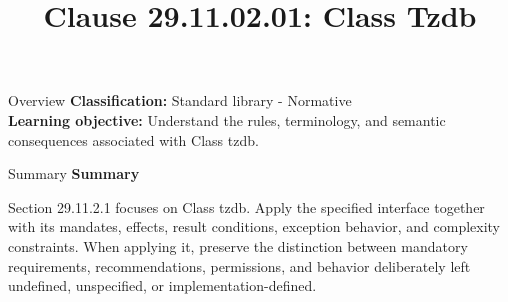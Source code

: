 \documentclass[10pt,letterpaper]{article}
\title{Clause 29.11.02.01: Class Tzdb}
\author{}
\date{}
\begin{document}
\maketitle
\begin{CornellOverviewBox}{Overview}
\textbf{Classification:} Standard library - Normative\\[2pt]
\textbf{Learning objective:} Understand the rules, terminology, and semantic consequences associated with Class tzdb.
\end{CornellOverviewBox}\begin{CornellSummaryBox}{Summary}
{\sffamily\bfseries\color{Accent} Summary}\par\vspace{3pt}Section 29.11.2.1 focuses on Class tzdb. Apply the specified interface together with its mandates, effects, result conditions, exception behavior, and complexity constraints. When applying it, preserve the distinction between mandatory requirements, recommendations, permissions, and behavior deliberately left undefined, unspecified, or implementation-defined.
\end{CornellSummaryBox}
\end{document}
